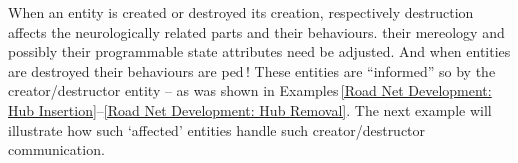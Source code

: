 \mnewfoil
{}%

\label{Adjustment}

\begynd
\pind When an entity
\begynd
\pind is created or destroyed 
\pind its creation, respectively destruction
\pind affects the neurologically related parts
      and their behaviours.
\begynd
\pind their mereology 
\pind and possibly their programmable state attributes
\pind need be adjusted.
\afslut
\pind And when entities are destroyed \nyl
      their behaviours are ped\,!
\pind These entities are ``informed'' so by the creator/destructor
      entity \nyl -- as was shown in Examples\,\ref{Road Net
      Development: Hub Insertion}--\ref{Road Net Development: Hub
      Removal}. 
\afslut
\pind The next example will illustrate how such `affected' entities
      \nyl handle such  creator/destructor communication.
\afslut

